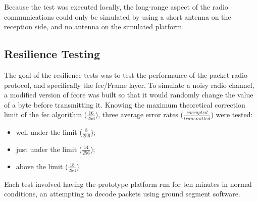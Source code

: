 Because the test was executed locally, the long-range aspect of the radio
communications could only be simulated by using a short antenna on the reception
side, and no antenna on the simulated platform.

\subsection{Resilience Testing}
\label{ssec:method-resilience}

The goal of the resilience tests was to test the performance of the packet radio
protocol, and specifically the \acrlong{fec}/Frame layer. To simulate a noisy
radio channel, a modified version of \acrshort{fcore} was built so that it
would randomly change the value of a byte before transmitting it. Knowing the
maximum theoretical correction limit of the \acrshort{fec} algorithm
($\frac{16}{256}$), three average error rates
($\frac{corrupted}{transmitted}$) were tested:

\begin{itemize}
    \item well under the limit ($\frac{8}{256}$);
    \item just under the limit ($\frac{14}{256}$);
    \item above the limit ($\frac{18}{256}$).
\end{itemize}

Each test involved having the prototype platform run for ten minutes in normal
conditions, an attempting to decode packets using ground segment software.
